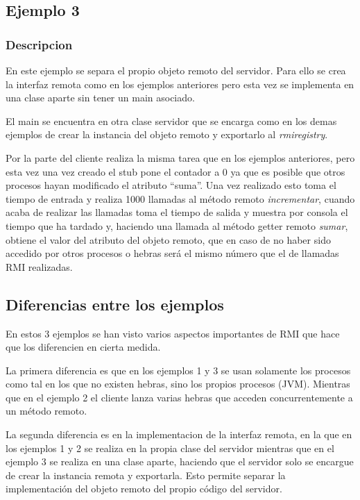 \documentclass{article}
\begin{document}


\subsection{Ejemplo 3}
\subsubsection{Descripcion}
En este ejemplo se separa el propio objeto remoto del servidor. Para ello se crea la interfaz remota como en los ejemplos anteriores pero esta vez se implementa en una clase aparte sin tener un main asociado.

El main se encuentra en otra clase servidor que se encarga como en los demas ejemplos de crear la instancia del objeto remoto y exportarlo al \textit{rmiregistry}.

\bigskip

Por la parte del cliente realiza la misma tarea que en los ejemplos anteriores, pero esta vez una vez creado el stub pone el contador a 0 ya que es posible que otros procesos hayan modificado el atributo ``suma''. Una vez realizado esto toma el tiempo de entrada y realiza 1000 llamadas al método remoto \textit{incrementar}, cuando acaba de realizar las llamadas toma el tiempo de salida y muestra por consola el tiempo que ha tardado y, haciendo una llamada al método getter remoto \textit{sumar}, obtiene el valor del atributo del objeto remoto, que en caso de no haber sido accedido por otros procesos o hebras será el mismo número que el de llamadas RMI realizadas.

\subsection{Diferencias entre los ejemplos}
En estos 3 ejemplos se han visto varios aspectos importantes de RMI que hace que los diferencien en cierta medida. 

La primera diferencia es que en los ejemplos 1 y 3 se usan solamente los procesos como tal en los que no existen hebras, sino los propios procesos (JVM). Mientras que en el ejemplo 2 el cliente lanza varias hebras que acceden concurrentemente a un método remoto.

La segunda diferencia es en la implementacion de la interfaz remota, en la que en los ejemplos 1 y 2 se realiza en la propia clase del servidor mientras que en el ejemplo 3 se realiza en una clase aparte, haciendo que el servidor solo se encargue de crear la instancia remota y exportarla. Esto permite separar la implementación del objeto remoto del propio código del servidor.
\end{document}
